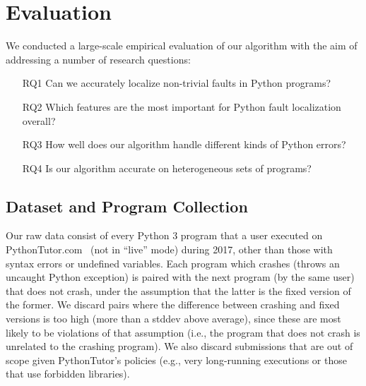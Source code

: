 \documentclass[conference]{IEEEtran}
\begin{document}


\section{Evaluation}
\label{sec-eval}

We conducted a large-scale empirical evaluation of our algorithm with the
aim of addressing a number of research questions:
\begin{enumerate}

\item[RQ1]{Can we accurately localize non-trivial faults in Python
programs?}

\item[RQ2]{Which features are the most important for Python fault
localization overall?}


\item[RQ3]{How well does our algorithm handle different kinds of Python errors?}

\item[RQ4]{Is our algorithm accurate on heterogeneous sets of programs?}

\end{enumerate}

\subsection{Dataset and Program Collection}

Our raw data consist of every Python 3 program that a user executed on
PythonTutor.com~\cite{Guo2013-vu} (not in ``live'' mode) during 2017, other
than those with syntax errors or undefined variables.  Each program which
crashes (throws an uncaught Python exception) is paired with the next
program (by the same user) that does not crash, under the assumption that
the latter is the fixed version of the former. We discard pairs where the
difference between crashing and fixed versions is too high (more than a
stddev above average), since these are most likely to be violations of that
assumption (i.e., the program that does not crash is unrelated to the
crashing program). We also discard submissions that are out of scope given
PythonTutor's policies (e.g., very long-running executions or those that 
use forbidden libraries).
\end{document}
